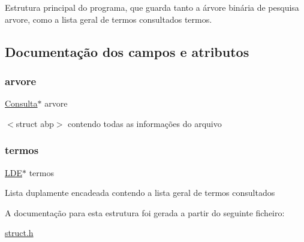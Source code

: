 Estrutura principal do programa, que guarda tanto a árvore binária de pesquisa {\ttfamily arvore}, como a lista geral de termos consultados {\ttfamily termos}. 

\subsection{Documentação dos campos e atributos}
\mbox{\label{structdescritor_a523b6d27352566be093cada88aa655d4}} 
\subsubsection{\texorpdfstring{arvore}{arvore}}
{\footnotesize\ttfamily \hyperlink{struct_8h_a1664119ce88635d3bf4655a988ef8248}{Consulta}$\ast$ arvore}

$<$struct abp$>$ contendo todas as informações do arquivo \mbox{\label{structdescritor_a4f74c1b0743b541ef2b21dec4fa4da2e}} 
\subsubsection{\texorpdfstring{termos}{termos}}
{\footnotesize\ttfamily \hyperlink{struct_8h_ae030205799002e4fc414e374283d8598}{L\+DE}$\ast$ termos}

Lista duplamente encadeada contendo a lista geral de termos consultados 

A documentação para esta estrutura foi gerada a partir do seguinte ficheiro\+:\begin{DoxyCompactItemize}
\item 
\hyperlink{struct_8h}{struct.\+h}\end{DoxyCompactItemize}
